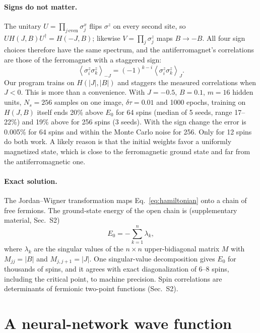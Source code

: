 \documentclass[aps,prb,preprint,amsmath,amssymb,nofootinbib,longbibliography]{revtex4-2}
\newcommand{\ev}[1]{\left\langle #1 \right\rangle}
\newcommand{\dtau}{\delta\tau}
\begin{document}
\paragraph*{Signs do not matter.}
The unitary $U = \prod_{j\,\mathrm{even}} \sigma^x_j$ flips $\sigma^z$ on every second site, so $U H(J,B) U^\dagger
= H(-J,B)$; likewise $V = \prod_j \sigma^z_j$ maps $B \to -B$. All four sign choices therefore have the same
spectrum, and the antiferromagnet's correlations are those of the ferromagnet with a staggered sign:
\begin{equation}
  \ev{\sigma^z_i \sigma^z_k}_{-J} = (-1)^{k-i} \ev{\sigma^z_i \sigma^z_k}_{J} .
  \label{eq:stagger}
\end{equation}
Our program trains on $H(|J|,|B|)$ and staggers the measured correlations when $J < 0$. This is more than a
convenience. With $J = -0.5$, $B = 0.1$, $m = 16$ hidden units, $N_s = 256$ samples on one image, $\dtau = 0.01$ and
1000 epochs, training on $H(J,B)$ itself ends 20\% above $E_0$ for 64 spins (median of 5 seeds, range 17--22\%) and
19\% above for 256 spins (3 seeds). With the sign change the error is 0.005\% for 64 spins and within the Monte Carlo
noise for 256. Only for 12 spins do both work. A likely reason is that the initial weights favor a uniformly
magnetized state, which is close to the ferromagnetic ground state and far from the antiferromagnetic one.

\paragraph*{Exact solution.}
The Jordan--Wigner transformation maps Eq.~\eqref{eq:hamiltonian} onto a chain of free
fermions.\cite{lieb1961,pfeuty1970,mbeng2024} The ground-state energy of the open chain is (supplementary material,
Sec.~S2)
\begin{equation}
  E_0 = -\sum_{k=1}^{n} \lambda_k ,
  \label{eq:exact-energy}
\end{equation}
where $\lambda_k$ are the singular values of the $n\times n$ upper-bidiagonal matrix $M$ with $M_{jj} = |B|$ and
$M_{j,j+1} = |J|$. One singular-value decomposition gives $E_0$ for thousands of spins, and it agrees with exact
diagonalization of 6--8 spins, including the critical point, to machine precision. Spin correlations are
determinants of fermionic two-point functions (Sec.~S2).

\section{A neural-network wave function}
\label{sec:rbm}
\end{document}
